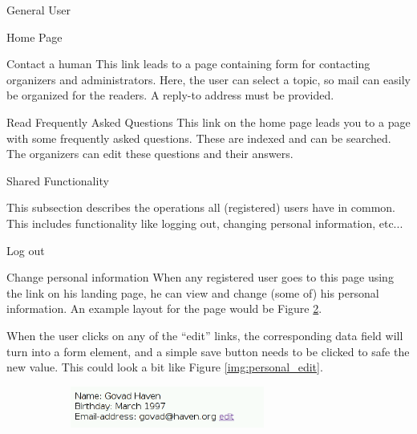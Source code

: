\begin{section}{General User}
\begin{subsection}{Home Page}
        \begin{subsubsection}{Contact a human}
            This link leads to a page containing form for contacting organizers
            and administrators. Here, the user can select a topic, so mail can
            easily be organized for the readers. A reply-to address must be
            provided.
        \end{subsubsection}

        \begin{subsubsection}{Read Frequently Asked Questions}
            This link on the home page leads you to a page with some frequently
            asked questions. These are indexed and can be searched. The
            organizers can edit these questions and their answers.
        \end{subsubsection}

    \end{subsection}

    \begin{subsection}{Shared Functionality}

        This subsection describes the operations all (registered) users have in
        common. This includes functionality like logging out, changing personal
        information, etc...

        \begin{subsubsection}{Log out}
        \end{subsubsection}

        \begin{subsubsection}{Change personal information}
            When any registered user goes to this page using the link on his
            landing page, he can view and change (some of) his personal
            information. An example layout for the page would be Figure
            \ref{img:personal}.

            When the user clicks on any of the ``edit'' links, the corresponding
            data field will turn into a form element, and a simple save button
            needs to be clicked to safe the new value. This could look a bit
            like Figure \ref{img:personal_edit}.

            \begin{figure}
                \centering
                \begin{subfigure}{0.3\textwidth}
                    \includegraphics[width=0.7\textwidth]{img/personal_u.png}
                    \label{img:personal}
                \end{subfigure}


\end{figure}
\end{subsubsection}
\end{subsection}
\end{section}
